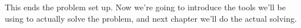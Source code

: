 \documentclass[oneside, 12pt, notitlepage]{book}
\begin{document}
This ends the problem set up. Now we're going to introduce the tools we'll be using to actually solve the problem, and next chapter we'll do the actual solving.



\nocite{*}
\end{document}
